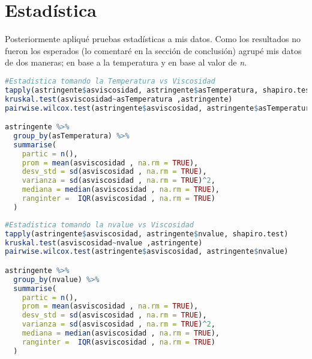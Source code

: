 \documentclass{elsarticle}
\begin{document}
\section{Estad\'istica}
Posteriormente apliqu\'e pruebas estad\'isticas a mis datos.
Como los resultados no fueron los esperados (lo comentar\'e en la secci\'on de conclusi\'on) agrup\'e mis datos de dos maneras; en base a la temperatura y en base al valor de \textit{n}.

\begin{lstlisting}[language=R, caption= Segmento de c\'odigo pruebas estad\'isticas agrupando por temperatura.]
#Estadistica tomando la Temperatura vs Viscosidad
tapply(astringente$asviscosidad, astringente$asTemperatura, shapiro.test)
kruskal.test(asviscosidad~asTemperatura ,astringente)
pairwise.wilcox.test(astringente$asviscosidad, astringente$asTemperatura)

astringente %>%
  group_by(asTemperatura) %>%
  summarise(
    partic = n(),
    prom = mean(asviscosidad , na.rm = TRUE),
    desv_std = sd(asviscosidad , na.rm = TRUE),
    varianza = sd(asviscosidad , na.rm = TRUE)^2,
    mediana = median(asviscosidad , na.rm = TRUE),
    ranginter =  IQR(asviscosidad , na.rm = TRUE)
  )
\end{lstlisting}

\begin{lstlisting}[language=R, caption= Segmento de c\'odigo pruebas estad\'isticas agrupando por el valor de \textit{n}.]
#Estadistica tomando la nvalue vs Viscosidad
tapply(astringente$asviscosidad, astringente$nvalue, shapiro.test)
kruskal.test(asviscosidad~nvalue ,astringente)
pairwise.wilcox.test(astringente$asviscosidad, astringente$nvalue)

astringente %>%
  group_by(nvalue) %>%
  summarise(
    partic = n(),
    prom = mean(asviscosidad , na.rm = TRUE),
    desv_std = sd(asviscosidad , na.rm = TRUE),
    varianza = sd(asviscosidad , na.rm = TRUE)^2,
    mediana = median(asviscosidad , na.rm = TRUE),
    ranginter =  IQR(asviscosidad , na.rm = TRUE)
  )
\end{lstlisting}
\end{document}
